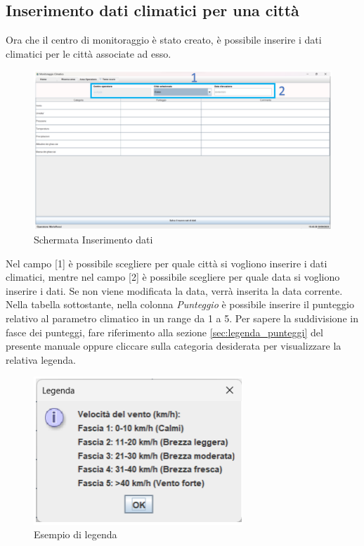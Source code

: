 \subsection{Inserimento dati climatici per una città}
Ora che il centro di monitoraggio è stato creato, è possibile inserire i dati climatici per le città associate ad esso.\\ 

\begin{figure}[H]
    \centering
    \includegraphics[width=1\textwidth]{../../img/schermata_inserimento_dati.png}
    \caption{Schermata Inserimento dati}
\end{figure}

Nel campo [1] è possibile scegliere per quale città si vogliono inserire i dati climatici, mentre nel campo [2] è possibile scegliere per quale data
si vogliono inserire i dati.
Se non viene modificata la data, verrà inserita la data corrente.\\

Nella tabella sottostante, nella colonna \emph{Punteggio} è possibile inserire il punteggio relativo al parametro climatico in un range da 1 a 5.
Per sapere la suddivisione in fasce dei punteggi, fare riferimento alla sezione \ref{sec:legenda_punteggi} del presente manuale
oppure cliccare sulla categoria desiderata per visualizzare la relativa legenda.\\

\begin{figure}[H]
    \centering
    \includegraphics[width=0.7\textwidth]{../../img/esempio_legenda.png}
    \caption{Esempio di legenda}
\end{figure}

